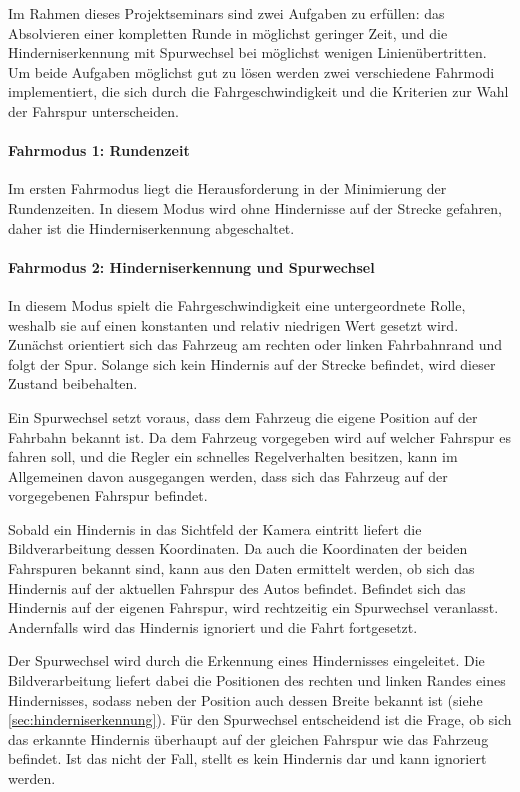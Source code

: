 Im Rahmen dieses Projektseminars sind zwei Aufgaben zu erfüllen: das Absolvieren einer kompletten Runde in möglichst geringer Zeit, und die Hinderniserkennung mit Spurwechsel bei möglichst wenigen Linienübertritten. Um beide Aufgaben möglichst gut zu lösen werden zwei verschiedene Fahrmodi implementiert, die sich durch die Fahrgeschwindigkeit und die Kriterien zur Wahl der Fahrspur unterscheiden.

\paragraph{Fahrmodus 1: Rundenzeit}


Im ersten Fahrmodus liegt die Herausforderung in der Minimierung der Rundenzeiten. In diesem Modus wird ohne Hindernisse auf der Strecke gefahren, daher ist die Hinderniserkennung abgeschaltet. 

\paragraph{Fahrmodus 2: Hinderniserkennung und Spurwechsel}

In diesem Modus spielt die Fahrgeschwindigkeit eine untergeordnete Rolle, weshalb sie auf einen konstanten und relativ niedrigen Wert gesetzt wird. Zunächst orientiert sich das Fahrzeug am rechten oder linken Fahrbahnrand und folgt der Spur. Solange sich kein Hindernis auf der Strecke befindet, wird dieser Zustand beibehalten. 

Ein Spurwechsel setzt voraus, dass dem Fahrzeug die eigene Position auf der Fahrbahn bekannt ist. Da dem Fahrzeug vorgegeben wird auf welcher Fahrspur es fahren soll, und die Regler ein schnelles Regelverhalten besitzen, kann im Allgemeinen davon ausgegangen werden, dass sich das Fahrzeug auf der vorgegebenen Fahrspur befindet.

Sobald ein Hindernis in das Sichtfeld der Kamera eintritt liefert die Bildverarbeitung dessen Koordinaten. Da auch die Koordinaten der beiden Fahrspuren bekannt sind, kann aus den Daten ermittelt werden, ob sich das Hindernis auf der aktuellen Fahrspur des Autos befindet. Befindet sich das Hindernis auf der eigenen Fahrspur, wird rechtzeitig ein Spurwechsel veranlasst. Andernfalls wird das Hindernis ignoriert und die Fahrt fortgesetzt.

Der Spurwechsel wird durch die Erkennung eines Hindernisses eingeleitet. Die Bildverarbeitung liefert dabei die Positionen des rechten und linken Randes eines Hindernisses, sodass neben der Position auch dessen Breite bekannt ist (siehe \autoref{sec:hinderniserkennung}). Für den Spurwechsel entscheidend ist die Frage, ob sich das erkannte Hindernis überhaupt auf der gleichen Fahrspur wie das Fahrzeug befindet. Ist das nicht der Fall, stellt es kein Hindernis dar und kann ignoriert werden.


